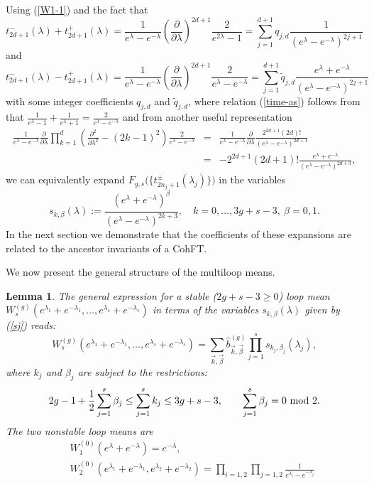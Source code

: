 \documentclass[11pt]{article}
\def\bea{\begin{eqnarray}}
\def\eea{\end{eqnarray}}
\def\bea{\begin{eqnarray}}
\def\eea{\end{eqnarray}}
\def\pa{\partial}
\def\beq{\begin{equation}}
\def\eeq{\end{equation}}
\theoremstyle{plain}
\newtheorem{lemma}{Lemma}
\theoremstyle{definition}
\def\beq{\begin{equation}}
\def\eeq{\end{equation}}
\def\bea{\begin{eqnarray}}
\def\eea{\end{eqnarray}}
\begin{document}
Using (\ref{W1-1}) and the fact that
\beq
\label{time-w}
t^{-}_{2d+1}(\lambda)+t^{+}_{2d+1}(\lambda)=
\frac{1}{e^{\lambda}-e^{-\lambda}}
\left(\frac{\partial}{\partial \lambda}\right)^{2d+1}\frac{2}{e^{2\lambda}-1}
=\sum_{j=1}^{d+1}q_{j,d}\frac{1}{(e^\lambda-e^{-\lambda})^{2j+1}}
\eeq
and
\beq
\label{time-as}
t^{-}_{2d+1}(\lambda)-t^{+}_{2d+1}(\lambda)=
\frac{1}{e^{\lambda}-e^{-\lambda}}
\left(\frac{\partial}{\partial \lambda}\right)^{2d+1}\frac{2}{e^{\lambda}-e^{-\lambda}}
=\sum_{j=1}^{d+1}\tilde q_{j,d}\frac{e^\lambda+e^{-\lambda}}{(e^\lambda-e^{-\lambda})^{2j+1}}
\eeq
with some integer coefficients $q_{j,d}$ and $\tilde q_{j,d}$, where relation (\ref{time-as}) follows from
that $\frac{1}{e^\lambda-1}+\frac{1}{e^\lambda+1}=\frac{2}{e^\lambda-e^{-\lambda}}$
and from another useful representation
\bea
\frac{1}{e^{\lambda}-e^{-\lambda}}\frac{\partial}{\partial\lambda}
\prod_{k=1}^{d}\left(\frac{\pa^{2}}{\pa \lambda^{2}}-(2k-1)^2\right)\frac{2}{e^\lambda-e^{-\lambda}}
&=&\frac{1}{e^{\lambda}-e^{-\lambda}}\frac{\partial}{\partial\lambda}
\frac{2^{2d+1} (2d)!}{(e^\lambda-e^{-\lambda})^{2d+1}}\nonumber\\
&=&-2^{2d+1}(2d+1)!
\frac{e^\lambda+e^{-\lambda}}{(e^\lambda-e^{-\lambda})^{2d+3}},
\label{W1-as}
\eea
we can equivalently expand $F_{g,s}\bigl(\{t^{\pm}_{2n_j+1}(\lambda_{j})\}\bigr)$
in  the variables
\beq
\label{sj}
s_{k,\beta}(\lambda):=\frac{(e^{\lambda}+e^{-\lambda})^\beta_{}}{{(e^{\lambda}-e^{-\lambda})^{2k+3}}},
\quad k=0,\dots,3g+s-3, \ \beta=0,1.
\eeq
In the next section we demonstrate that the coefficients of these expansions
are related to the ancestor invariants of a CohFT.

We now present the general structure of the multiloop means.
\begin{lemma}\label{lm:multiloop}
The general expression for a stable ($2g+s-3\ge 0$) loop mean
$W_s^{(g)}(e^{\lambda_1}+e^{-\lambda_1},\dots,e^{\lambda_s}+e^{-\lambda_s})$ in terms of
the variables $s_{k,\beta}(\lambda)$ given by (\ref{sj}) reads:
\beq
W_s^{(g)}(e^{\lambda_1}+e^{-\lambda_1},\dots,e^{\lambda_s}+e^{-\lambda_s})
=\sum_{\vec{k},\vec{\beta}}\widehat{b}^{(g)}_{\vec{k},\vec{\beta}}\prod_{j=1}^s s_{k_j,\beta_j}(\lambda_j),
\label{W->sk}
\eeq
where $k_j$ and $\beta_j$ are subject to the restrictions:
\beq
2g-1+\frac12\sum_{j=1}^s\beta_j\le \sum_{j=1}^s k_j\le 3g+s-3,
\qquad \sum_{j=1}^s\beta_j=0\ \hbox{mod}\ 2.
\label{restr-k}
\eeq
The two nonstable loop means are
\bea
&{}&W_1^{(0)}(e^{\lambda}+e^{-\lambda})=e^{-\lambda},
\label{W10}\\
&{}&W_2^{(0)}(e^{\lambda_1}+e^{-\lambda_1},e^{\lambda_2}+e^{-\lambda_2})=\prod_{i=1,2}\prod_{j=1,2}
\frac{1}{e^{\lambda_i}-e^{-\lambda_j}}
\label{W20}
\eea
\end{lemma}
\end{document}
